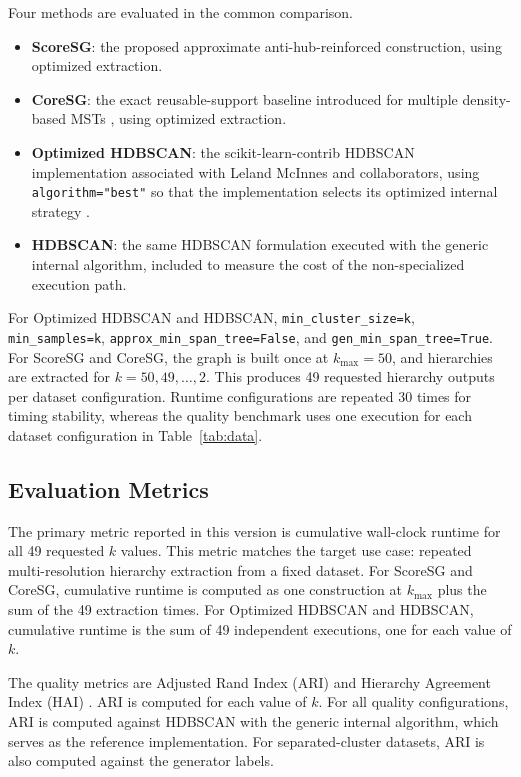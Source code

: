 \documentclass[11pt]{article}
\begin{document}
Four methods are evaluated in the common comparison.
\begin{itemize}[leftmargin=*]
  \item \textbf{ScoreSG}: the proposed approximate anti-hub-reinforced construction, using optimized extraction.
  \item \textbf{CoreSG}: the exact reusable-support baseline introduced for multiple density-based MSTs \citep{araujo2022coresg}, using optimized extraction.
  \item \textbf{Optimized HDBSCAN}: the scikit-learn-contrib HDBSCAN implementation associated with Leland McInnes and collaborators, using \texttt{algorithm="best"} so that the implementation selects its optimized internal strategy \citep{mcinnes2017accelerated,hdbscansoftware}.
  \item \textbf{HDBSCAN}: the same HDBSCAN formulation executed with the generic internal algorithm, included to measure the cost of the non-specialized execution path.
\end{itemize}

For Optimized HDBSCAN and HDBSCAN, \texttt{min\_cluster\_size=k}, \texttt{min\_samples=k}, \texttt{approx\_min\_span\_tree=False}, and \texttt{gen\_min\_span\_tree=True}. For ScoreSG and CoreSG, the graph is built once at \(k_{\max}=50\), and hierarchies are extracted for \(k=50,49,\ldots,2\). This produces 49 requested hierarchy outputs per dataset configuration. Runtime configurations are repeated 30 times for timing stability, whereas the quality benchmark uses one execution for each dataset configuration in Table~\ref{tab:data}.

\subsection{Evaluation Metrics}

The primary metric reported in this version is cumulative wall-clock runtime for all 49 requested \(k\) values. This metric matches the target use case: repeated multi-resolution hierarchy extraction from a fixed dataset. For ScoreSG and CoreSG, cumulative runtime is computed as one construction at \(k_{\max}\) plus the sum of the 49 extraction times. For Optimized HDBSCAN and HDBSCAN, cumulative runtime is the sum of 49 independent executions, one for each value of \(k\).

The quality metrics are Adjusted Rand Index (ARI) \citep{hubert1985comparing} and Hierarchy Agreement Index (HAI) \citep{johnson2013comprehensive}. ARI is computed for each value of \(k\). For all quality configurations, ARI is computed against HDBSCAN with the generic internal algorithm, which serves as the reference implementation. For separated-cluster datasets, ARI is also computed against the generator labels.
\end{document}
